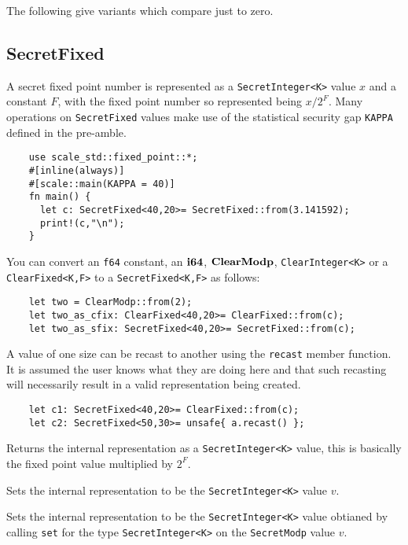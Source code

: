 \noindent
The following give variants which compare just to zero.



\subsection{SecretFixed}
A secret fixed point number is represented as a \verb|SecretInteger<K>| value $x$ and
a constant $F$, with the fixed point number so represented being $x/2^F$.
Many operations on \verb|SecretFixed| values make use of the statistical
security gap \verb|KAPPA| defined in the pre-amble.

\begin{lstlisting}
    use scale_std::fixed_point::*;
    #[inline(always)]
    #[scale::main(KAPPA = 40)]
    fn main() {
      let c: SecretFixed<40,20>= SecretFixed::from(3.141592);
      print!(c,"\n");
    }
\end{lstlisting}

You can convert an \verb|f64| constant, an $\mathbf{i64}$,  $\mathbf{ClearModp}$,
\verb|ClearInteger<K>| or a \verb|ClearFixed<K,F>| to a \verb|SecretFixed<K,F>| as follows:
\begin{lstlisting}
    let two = ClearModp::from(2);
    let two_as_cfix: ClearFixed<40,20>= ClearFixed::from(c);
    let two_as_sfix: SecretFixed<40,20>= SecretFixed::from(c);
\end{lstlisting}

A value of one size can be recast to another using the \verb|recast|
member function. It is assumed the user knows what they are doing here
and that such recasting will necessarily result in a valid representation
being created.
\begin{lstlisting}
    let c1: SecretFixed<40,20>= ClearFixed::from(c);
    let c2: SecretFixed<50,30>= unsafe{ a.recast() };
\end{lstlisting}

Returns the internal representation as a \verb|SecretInteger<K>| value,
this is basically the fixed point value multiplied by $2^F$.

Sets the internal representation to be the \verb|SecretInteger<K>| value $v$.

Sets the internal representation to be the \verb|SecretInteger<K>| value obtianed by calling \verb|set| for the type
\verb|SecretInteger<K>| on the \verb|SecretModp| value $v$.


